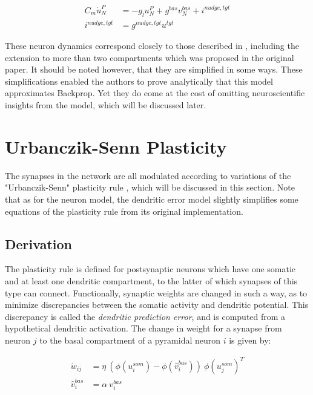 \begin{align}
  C_m \dot{u}_N^P & = - g_l u_N^{P} + g^{bas} v_N^{bas} + i^{nudge, tgt} \\
  i^{nudge, tgt}  & = g^{nudge, tgt} u^{tgt}
\end{align}


These neuron dynamics correspond closely to those described in \citep{urbanczik2014learning}, including the extension to
more than two compartments which was proposed in the original paper. It should be noted however, that they are
simplified in some ways. These simplifications enabled the authors to prove analytically that this model approximates
Backprop. Yet they do come at the cost of omitting neuroscientific insights from the model, which will be discussed
later.

\section{Urbanczik-Senn Plasticity}\label{sec-urb-senn-plast}

The synapses in the network are all modulated according to variations of the "Urbanczik-Senn" plasticity rule
\citep{urbanczik2014learning}, which will be discussed in this section. Note that as for the neuron model, the dendritic
error model slightly simplifies some equations of the plasticity rule from its original implementation.

\subsection{Derivation}

The plasticity rule is defined for postsynaptic neurons which have one somatic and at least one dendritic compartment,
to the latter of which synapses of this type can connect. Functionally, synaptic weights are changed in such a way, as
to minimize discrepancies between the somatic activity and dendritic potential. This discrepancy is called the
\textit{dendritic prediction error}, and is computed from a hypothetical dendritic activation. The change in weight for
a synapse from neuron $j$ to the basal compartment of a pyramidal neuron $i$ is given by:

\begin{align}
  \dot{w}_{ij}    & = \eta \ ( \phi(u_i^{som}) - \phi(\hat{v}_i^{bas}) ) \ \phi(u_j^{som})^T \\
  \hat{v}_i^{bas} & = \alpha \  v_i^{bas}
\end{align}

